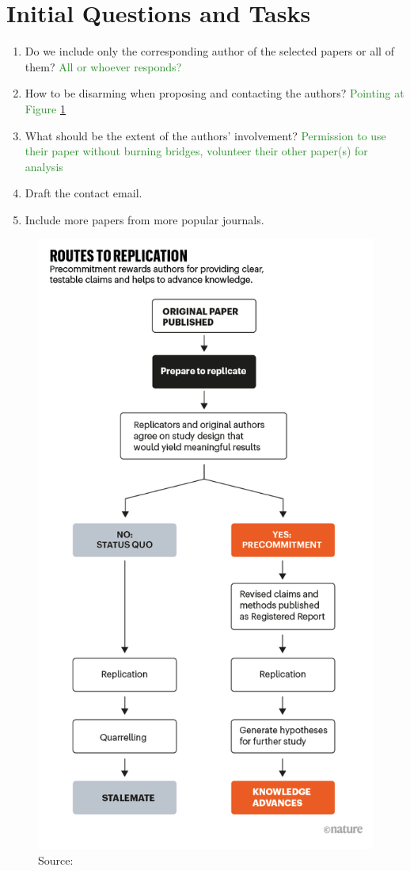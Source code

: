 \documentclass{article}
\begin{document}
\section{Initial Questions and Tasks}
\begin{enumerate}
    \item Do we include only the corresponding author of the selected papers or all of them? \textcolor{ForestGreen}{All or whoever responds?}
    \item How to be disarming when proposing and contacting the authors? \textcolor{ForestGreen}{Pointing at Figure \ref{fig:nature_replication}}
    \item What should be the extent of the authors' involvement? \textcolor{ForestGreen}{Permission to use their paper without burning bridges, volunteer their other paper(s) for analysis}
    \item Draft the contact email.
    \item Include more papers from more popular journals.
\end{enumerate}

\begin{figure}
    \centering
    \includegraphics[scale = 0.4]{replication.png}
    \caption{Source: \cite{nosek2020best}}
    \label{fig:nature_replication}
\end{figure}


\end{document}
